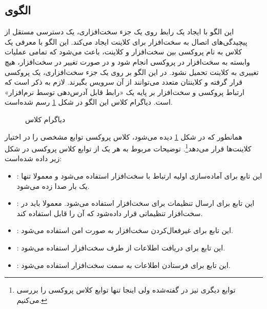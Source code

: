 \subsection{الگوی }
\begin{RTL}
این الگو با ایجاد یک رابط روی یک جزء سخت‌افزاری، یک دسترسی
مستقل از پیچیدگی‌های اتصال به سخت‌افزار برای کلاینت ایجاد می‌کند.
این الگو با معرفی یک کلاس به نام پروکسی بین سخت‌افزار و کلاینت،
باعث می‌شود که تمامی عملیات وابسته به سخت‌افزار در پروکسی انجام شود
و در صورت تغییر در سخت‌افزار، هیچ تغییری به کلاینت تحمیل نشود.
در این الگو بر روی یک جزء سخت‌افزاری، یک پروکسی قرار گرفته و
کلاینتان متعدد می‌توانند از آن سرویس بگیرند. لازم به ذکر است که ارتباط پروکسی
و سخت‌افزار بر پایه یک «رابط قابل آدرس‌دهی توسط نرم‌افزار» است. 
دیاگرام کلاس این الگو در شکل \ref{HWProxyClassDiag} رسم شده‌است.
\end{RTL}
\begin{figure}[h!]
\centering
{}
\caption{دیاگرام کلاس }
\label{HWProxyClassDiag}
\end{figure}
\begin{RTL}
همانطور که در شکل \ref{HWProxyClassDiag} دیده می‌شود، کلاس پروکسی توابع
مشخصی را در اختیار کلاینت‌ها قرار می‌دهد\footnote{توابع دیگری نیز در \cite{ref1}
گفته‌شده ولی اینجا تنها توابع  کلاس پروکسی را بررسی می‌کنیم.}.
توضیحات مربوط به هر یک از توابع کلاس پروکسی در شکل زیر داده شده‌است:
\begin{itemize}
  \item {}:
  این تابع برای آماده‌سازی اولیه ارتباط با سخت‌افزار استفاده می‌شود و معمولا تنها یک بار
  صدا زده می‌شود.
  \item {}:
  این تابع برای ارسال تنظیمات برای سخت‌افزار استفاده می‌شود. معمولا باید در سخت‌افزار
  تنظیماتی قرار داده‌شود که آن را قابل استفاده کند.
  \item {}:
  این تابع برای غیرفعال‌کردن سخت‌افزار به صورت امن استفاده می‌شود.
  \item {}:
  این تابع برای دریافت اطلاعات از طرف سخت‌افزار استفاده می‌شود.
  \item {}:
  این تابع برای فرستادن اطلاعات به سمت سخت‌افزار استفاده می‌شود.
\end{itemize}
\end{RTL}